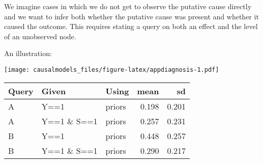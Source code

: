 \documentclass[
  12pt,
]{book}
\newenvironment{Shaded}{\begin{snugshade}}{\end{snugshade}}
\newcommand{\DataTypeTok}[1]{\textcolor[rgb]{0.13,0.29,0.53}{#1}}
\newcommand{\KeywordTok}[1]{\textcolor[rgb]{0.13,0.29,0.53}{\textbf{#1}}}
\newcommand{\NormalTok}[1]{#1}
\newcommand{\OperatorTok}[1]{\textcolor[rgb]{0.81,0.36,0.00}{\textbf{#1}}}
\newcommand{\OtherTok}[1]{\textcolor[rgb]{0.56,0.35,0.01}{#1}}
\newcommand{\StringTok}[1]{\textcolor[rgb]{0.31,0.60,0.02}{#1}}
\begin{document}
We imagine cases in which we do not get to observe the putative cause directly and we want to infer both whether the putative cause was present and whether it caused the outcome. This requires stating a query on both an effect and the level of an unobserved node.

An illustration:

\begin{Shaded}
\end{Shaded}

\texttt{[image: causalmodels\_files/figure-latex/appdiagnosis-1.pdf]}

\begin{Shaded}
\end{Shaded}

\begin{tabular}{l|l|l|r|r}
\hline
Query & Given & Using & mean & sd\\
\hline
A & Y==1 & priors & 0.198 & 0.201\\
\hline
A & Y==1 \& S==1 & priors & 0.257 & 0.231\\
\hline
B & Y==1 & priors & 0.448 & 0.257\\
\hline
B & Y==1 \& S==1 & priors & 0.290 & 0.217\\
\hline
\end{tabular}
\end{document}
